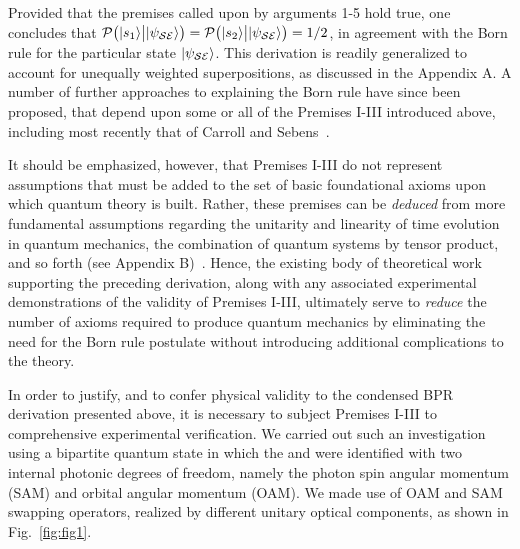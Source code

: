 \documentclass[12pt]{iopart}
\begin{document}
Provided that the premises called upon by arguments 1-5 hold true, one concludes that ${\cal P}\big(|s_1\rangle {\big |} |\psi_{\cal SE} \rangle \big)={\cal P}\big(|s_2\rangle {\big |} |\psi_{\cal SE} \rangle \big)=1/2$, in agreement with the Born rule for the particular state $ |\psi_{\cal SE} \rangle$. This derivation is readily generalized to account for unequally weighted superpositions, as discussed in the Appendix A.  A number of further approaches to explaining the Born rule have since been proposed, that depend upon some or all of the Premises I-III introduced above, including most recently that of Carroll and Sebens~\cite{carroll:14}.

It should be emphasized, however, that Premises I-III do not represent assumptions that must be added to the set of basic foundational axioms upon which quantum theory is built. Rather, these premises can be {\it deduced} from more fundamental assumptions regarding the unitarity and linearity of time evolution in quantum mechanics, the combination of quantum systems by tensor product, and so forth (see Appendix B)~\cite{zurek:05}. Hence, the existing body of theoretical work supporting the preceding derivation, along with any associated experimental demonstrations of the validity of Premises I-III, ultimately serve to \textit{reduce} the number of axioms required to produce quantum mechanics by eliminating the need for the Born rule postulate without introducing additional complications to the theory. 

In order to justify, and to confer physical validity to the condensed BPR derivation presented above, it is necessary to subject Premises I-III to comprehensive experimental verification. We carried out such an investigation using a bipartite quantum state in which the  and  were identified with two internal photonic degrees of freedom, namely the photon spin angular momentum (SAM) and orbital angular momentum (OAM). We made use of OAM and SAM swapping operators, realized by different unitary optical components, as shown in Fig.~\ref{fig:fig1}.
\end{document}

